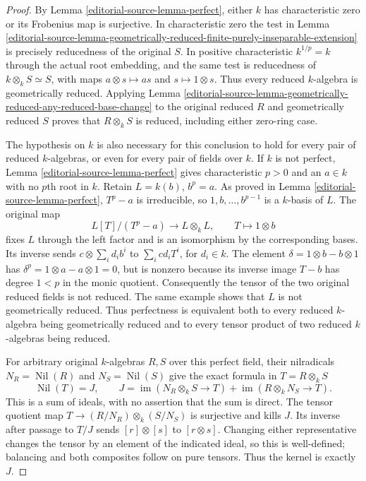 \begin{proof}
By Lemma \ref{editorial-source-lemma-perfect}, either $k$ has
characteristic zero or its Frobenius map is
surjective. In characteristic zero the test
in Lemma
\ref{editorial-source-lemma-geometrically-reduced-finite-purely-inseparable-extension}
is precisely reducedness of the original $S$.
In positive characteristic $k^{1/p}=k$ through
the actual root embedding, and the same test
is reducedness of $k\otimes_k S\simeq S$,
with maps $a\otimes s\mapsto as$ and
$s\mapsto1\otimes s$. Thus every reduced
$k$-algebra is geometrically reduced. Applying
Lemma \ref{editorial-source-lemma-geometrically-reduced-any-reduced-base-change}
to the original reduced $R$ and geometrically
reduced $S$ proves that $R\otimes_k S$ is
reduced, including either zero-ring case.

The hypothesis on $k$ is also necessary for
this conclusion to hold for every pair of
reduced $k$-algebras, or even for every pair
of fields over $k$. If $k$ is not perfect,
Lemma \ref{editorial-source-lemma-perfect} gives characteristic
$p>0$ and an $a\in k$ with no $p$th root in
$k$. Retain $L=k(b)$, $b^p=a$. As proved in
Lemma \ref{editorial-source-lemma-perfect}, $T^p-a$ is
irreducible, so $1,b,\ldots,b^{p-1}$ is a
$k$-basis of $L$. The original map
$$
L[T]/(T^p-a)\longrightarrow L\otimes_k L,
\qquad T\longmapsto1\otimes b
$$
fixes $L$ through the left factor and is an
isomorphism by the corresponding bases.
Its inverse sends $c\otimes\sum_i d_i b^i$
to $\sum_i cd_i T^i$, for $d_i\in k$.
The element $\delta=1\otimes b-b\otimes1$
has $\delta^p=1\otimes a-a\otimes1=0$,
but is nonzero because its inverse image
$T-b$ has degree $1<p$ in the monic
quotient. Consequently the tensor of the
two original reduced fields is not reduced.
The same example shows that $L$ is not
geometrically reduced. Thus perfectness is
equivalent both to every reduced $k$-algebra
being geometrically reduced and to every
tensor product of two reduced $k$-algebras
being reduced.

For arbitrary original $k$-algebras $R,S$
over this perfect field, their nilradicals
$N_R=\operatorname{Nil}(R)$ and
$N_S=\operatorname{Nil}(S)$ give the exact
formula in $T=R\otimes_k S$
$$
\operatorname{Nil}(T)=J,
\qquad
J=\operatorname{im}(N_R\otimes_k S\to T)
+\operatorname{im}(R\otimes_k N_S\to T).
$$
This is a sum of ideals, with no assertion
that the sum is direct. The tensor quotient
map $T\to (R/N_R)\otimes_k(S/N_S)$ is
surjective and kills $J$. Its inverse
after passage to $T/J$ sends
$[r]\otimes[s]$ to $[r\otimes s]$.
Changing either representative changes
the tensor by an element of the indicated
ideal, so this is well-defined; balancing
and both composites follow on pure tensors.
Thus the kernel is exactly $J$.


\end{proof}
